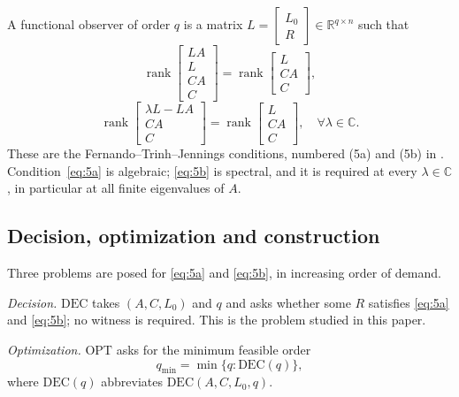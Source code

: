 \documentclass[journal]{IEEEtran}
\theoremstyle{plainn}
\theoremstyle{remark}
\begin{document}
A functional observer of order $q$ is a matrix $L=\begin{bmatrix}L_0 \\ R\end{bmatrix}\in\mathbb R^{q\times n}$ such
that
\begin{equation}\label{eq:5a}
\operatorname{rank}\begin{bmatrix}LA\\ L\\ CA\\ C\end{bmatrix}
=\operatorname{rank}\begin{bmatrix}L\\ CA\\ C\end{bmatrix},
\end{equation}
\begin{equation}\label{eq:5b}
\operatorname{rank}\begin{bmatrix}\lambda L-LA\\ CA\\ C\end{bmatrix}
=\operatorname{rank}\begin{bmatrix}L\\ CA\\ C\end{bmatrix},
\quad \forall\lambda\in\mathbb C.
\end{equation}
These are the Fernando--Trinh--Jennings conditions, numbered (5a) and (5b) in
\cite{fer10}. Condition~\eqref{eq:5a} is algebraic; \eqref{eq:5b} is spectral, and it is
required at every $\lambda\in\mathbb C$, in particular at all finite eigenvalues of $A$.

\subsection{Decision, optimization and construction}\label{sec:problems}

Three problems are posed for \eqref{eq:5a} and \eqref{eq:5b}, in increasing order of
demand.

\emph{Decision.} $\mathrm{DEC}$ takes $(A,C,L_0)$ and $q$ and asks whether some $R$
satisfies \eqref{eq:5a} and \eqref{eq:5b}; no witness is required. This is the problem
studied in this paper.

\emph{Optimization.} $\mathrm{OPT}$ asks for the minimum feasible order
\begin{equation*}
q_{\min}=\min\{q:\mathrm{DEC}(q)\},
\end{equation*}
where $\mathrm{DEC}(q)$ abbreviates $\mathrm{DEC}(A,C,L_0,q)$.
\end{document}
